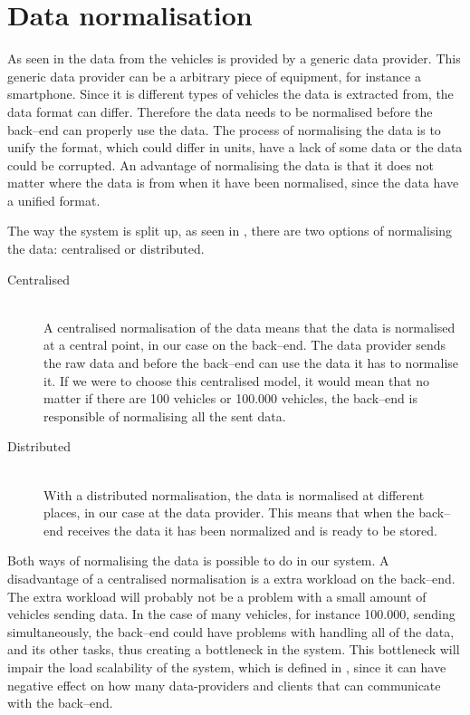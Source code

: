 \section{Data normalisation}
As seen in \cite{sec:architectural_design} the data from the vehicles is provided by a generic data provider.
This generic data provider can be a arbitrary piece of equipment, for instance a smartphone. 
Since it is different types of vehicles the data is extracted from, the data format can differ.
Therefore the data needs to be normalised before the back--end can properly use the data.
The process of normalising the data is to unify the format, which could differ in units, have a lack of some data or the data could be corrupted.
An advantage of normalising the data is that it does not matter where the data is from when it have been normalised, since the data have a unified format.

The way the system is split up, as seen in \cite{sec:architectural_design}, there are two options of normalising the data: centralised or distributed.

\begin{description}
    \item[Centralised] \hfill \\
    A centralised normalisation of the data means that the data is normalised at a central point, in our case on the back--end.
    The data provider sends the raw data and before the back--end can use the data it has to normalise it.
    If we were to choose this centralised model, it would mean that no matter if there are 100 vehicles or 100.000 vehicles, 
    the back--end is responsible of normalising all the sent data.
    
    \item[Distributed] \hfill \\
    With a distributed normalisation, the data is normalised at different places, in our case at the data provider. 
    This means that when the back--end receives the data it has been normalized and is ready to be stored.
\end{description}
\bigskip

Both ways of normalising the data is possible to do in our system.
A disadvantage of a centralised normalisation is a extra workload on the back--end.
The extra workload will probably not be a problem with a small amount of vehicles sending data.
In the case of many vehicles, for instance 100.000, sending simultaneously, the back--end could have problems with handling all of the data,
and its other tasks, thus creating a bottleneck in the system.
This bottleneck will impair the load scalability of the system, which is defined in ,
since it can have negative effect on how many data-providers and clients that can communicate with the back--end.


